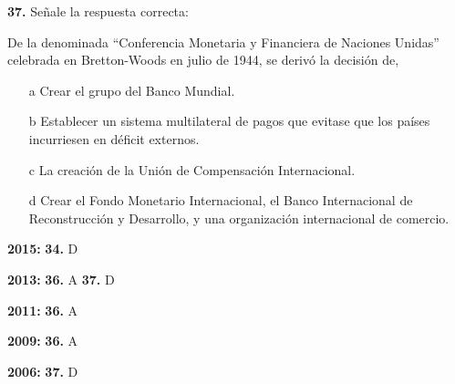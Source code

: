 \documentclass{nuevotema}
\begin{document}

\textbf{37.} Señale la respuesta correcta:

De la denominada ``Conferencia Monetaria y Financiera de Naciones Unidas'' celebrada en Bretton-Woods en julio de 1944, se derivó la decisión de,
\begin{itemize}
	\item[a] Crear el grupo del Banco Mundial.
	\item[b] Establecer un sistema multilateral de pagos que evitase que los países incurriesen en déficit externos.
	\item[c] La creación de la Unión de Compensación Internacional. 
	\item[d] Crear el Fondo Monetario Internacional, el Banco Internacional de Reconstrucción y Desarrollo, y una organización internacional de comercio.
\end{itemize}

\notas

\textbf{2015:} \textbf{34.} D

\textbf{2013:} \textbf{36.} A \textbf{37.} D

\textbf{2011:} \textbf{36.} A

\textbf{2009:} \textbf{36.} A

\textbf{2006:} \textbf{37.} D

\bibliografia
\end{document}
